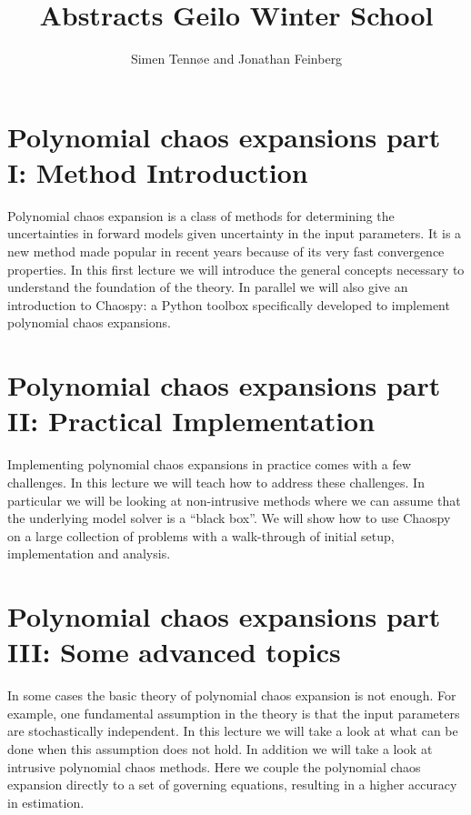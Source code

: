 \documentclass[a4paper,10pt]{article}
\title{Abstracts Geilo Winter School}
\author{Simen Tennøe and Jonathan Feinberg}
\begin{document}
\maketitle
\newpage


\section{Polynomial chaos expansions part I: Method Introduction}

Polynomial chaos expansion is a class of methods for determining the
uncertainties in forward models given uncertainty in the input parameters.
It is a new method made popular in recent years because of
its very fast convergence properties.
In this first lecture we will introduce the
general concepts necessary to understand the foundation of the theory.
In parallel we will also give an introduction to Chaospy: a Python
toolbox specifically developed to implement polynomial chaos
expansions.

\section{Polynomial chaos expansions part II: Practical Implementation}

Implementing polynomial chaos expansions in practice comes with a
few challenges.
In this lecture we will teach how to address these challenges.
In particular we will be looking at non-intrusive methods where we
can assume that the underlying model solver is a ``black box''.
We will show how to use Chaospy on a large collection of problems
with a walk-through of initial setup, implementation and analysis.

\section{Polynomial chaos expansions part III: Some advanced topics}

In some cases the basic theory of polynomial chaos expansion is not
enough.
For example, one fundamental assumption in the theory is that the
input parameters are stochastically independent.
In this lecture we will take a look at what
can be done when this assumption does not hold.
In addition we will take a look at intrusive polynomial chaos
methods.
Here we couple the polynomial chaos expansion directly to
a set of governing equations, resulting in a higher accuracy in
estimation.
\end{document}
